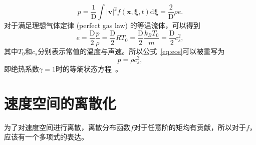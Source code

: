 \begin{equation}
    p=\frac{1}{\mathrm{D}} \int|\boldsymbol{v}|^2 f(\boldsymbol{x}, \boldsymbol{\xi}, t) \mathrm{d} \boldsymbol{\xi}=\frac{2}{\mathrm{D}} \rho e.
    \label{eq:eos}
\end{equation}
对于满足理想气体定律 (perfect gas law) 的等温流体，可以得到
\begin{equation}
    e=\frac{\mathrm{D}}{2} \frac{p}{\rho}=\frac{\mathrm{D}}{2} R T_0=\frac{\mathrm{D}}{2} \frac{k_B T_0}{m}=\frac{\mathrm{D}}{2} c_s^2,
\end{equation}
其中$T_0$和$c_s$分别表示常值的温度与声速。所以公式~\ref{eq:eos}可以被重写为
\begin{equation}
    p=\rho c_s^2,
\end{equation}
即绝热系数$\gamma=1$时的等熵状态方程~\cite{kundu2015fluid}。


\section{速度空间的离散化}
为了对速度空间进行离散，离散分布函数$f$对于任意阶的矩均有贡献，所以对于$f$，应该有一个多项式的表达。
